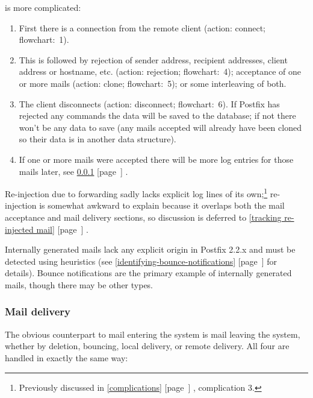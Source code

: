 \documentclass[a4paper,12pt,draft]{article}
\newcommand{\refwithpage}[1]{%
    \empty{}\ref{#1} [page~\pageref{#1}]%
}
\newcommand{\sectionref}[1]{%
    \textsection{}\refwithpage{#1}%
}
\begin{document}
\SMTP{} is more complicated:

\begin{enumerate}

    \item First there is a connection from the remote client (action:
        connect; flowchart:~1).

    \item This is followed by rejection of sender address, recipient
        addresses, client \IP{} address or hostname, etc. (action:
        rejection; flowchart:~4); acceptance of one or more mails (action:
        clone; flowchart:~5); or some interleaving of both.

    \item The client disconnects (action: disconnect; flowchart:~6).  If
        Postfix has rejected any \SMTP{} commands the data will be saved to
        the database; if not there won't be any data to save (any mails
        accepted will already have been cloned so their data is in another
        data structure).

    \item If one or more mails were accepted there will be more log entries
        for those mails later, see \sectionref{mail-delivery}.

\end{enumerate}

Re-injection due to forwarding sadly lacks explicit log lines of its
own;\footnote{Previously discussed in \sectionref{complications},
complication 3.} re-injection is somewhat awkward to explain because it
overlaps both the mail acceptance and mail delivery sections, so discussion
is deferred to \sectionref{tracking re-injected mail}.

Internally generated mails lack any explicit origin in Postfix 2.2.x and
must be detected using heuristics (see
\sectionref{identifying-bounce-notifications} for details).  Bounce
notifications are the primary example of internally generated mails, though
there may be other types.

\subsubsection{Mail delivery}

\label{mail-delivery}

The obvious counterpart to mail entering the system is mail leaving the
system, whether by deletion, bouncing, local delivery, or remote delivery.
All four are handled in exactly the same way:
\end{document}
